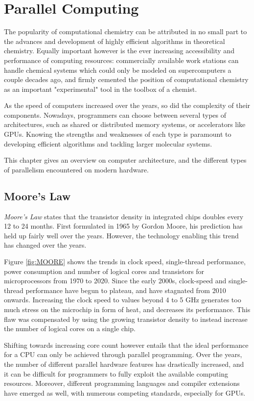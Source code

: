 \chapter{Parallel Computing}

The popularity of computational chemistry can be attributed in no small part to the advances and development of highly efficient algorithms in theoretical chemistry. Equally important however is the ever increasing accessibility and performance of computing resources: commercially available work stations can handle chemical systems which could only be modeled on supercomputers a couple decades ago, and firmly cemented the position of computational chemistry as an important "experimental" tool in the toolbox of a chemist. 

As the speed of computers increased over the years, so did the complexity of their components. Nowadays, programmers can choose between several types of architectures, such as shared or distributed memory systems, or accelerators like GPUs. Knowing the strengths and weaknesses of each type is paramount to developing efficient algorithms and tackling larger molecular systems.

This chapter gives an overview on computer architecture, and the different types of parallelism encountered on modern hardware.

\section{Moore's Law}

\emph{Moore's Law} states that the transistor density in integrated chips doubles every 12 to 24 months. First formulated in 1965 by Gordon Moore, his prediction has held up fairly well over the years. However, the technology enabling this trend has changed over the years.

Figure \ref{fig:MOORE} shows the trends in clock speed, single-thread performance, power consumption and number of logical cores and transistors for microprocessors from 1970 to 2020. Since the early 2000s, clock-speed and single-thread performance have begun to plateau, and have stagnated from 2010 onwards. Increasing the clock speed to values beyond 4 to 5 GHz generates too much stress on the microchip in form of heat, and decreases its performance. This flaw was compensated by using the growing transistor density to instead increase the number of logical cores on a single chip. 

Shifting towards increasing core count however entails that the ideal performance for a CPU can only be achieved through parallel programming. Over the years, the number of different parallel hardware features has drastically increased, and it can be difficult for programmers to fully exploit the available computing resources. Moreover, different programming languages and compiler extensions have emerged as well, with numerous competing standards, especially for GPUs. 

